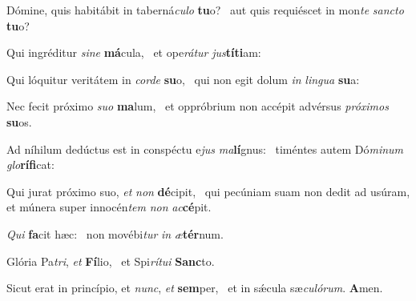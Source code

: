 \item Dómine, quis habitábit in taberná\textit{culo} \textbf{tu}o?~\psstar{} aut quis requiéscet in mon\textit{te} \textit{sancto} \textbf{tu}o?
\item Qui ingréditur \textit{sine} \textbf{má}cula,~\psstar{} et ope\textit{rátur} \textit{jus}\textbf{tí}\textbf{ti}am:
\item Qui lóquitur veritátem in \textit{corde} \textbf{su}o,~\psstar{} qui non egit dolum \textit{in} \textit{lingua} \textbf{su}a:
\item Nec fecit próximo \textit{suo} \textbf{ma}lum,~\psstar{} et oppróbrium non accépit advérsus \textit{próximos} \textbf{su}os.
\item Ad níhilum dedúctus est in conspéctu e\textit{jus} \textit{ma}\textbf{lí}gnus:~\psstar{} timéntes autem Dó\textit{minum} \textit{glo}\textbf{rí}\textbf{fi}cat:
\item Qui jurat próximo suo, \textit{et} \textit{non} \textbf{dé}cipit,~\psstar{} qui pecúniam suam non dedit ad usúram, et múnera super innocén\textit{tem} \textit{non} \textit{ac}\textbf{cé}pit.
\item \textit{Qui} \textbf{fa}cit hæc:~\psstar{} non movébi\textit{tur} \textit{in} \textit{æ}\textbf{tér}num.
\item Glória Pa\textit{tri}, \textit{et} \textbf{Fí}lio,~\psstar{} et Spi\textit{rítui} \textbf{Sanc}to.
\item Sicut erat in princípio, et \textit{nunc}, \textit{et} \textbf{sem}per,~\psstar{} et in sǽcula sæ\textit{culórum}. \textbf{A}men.
